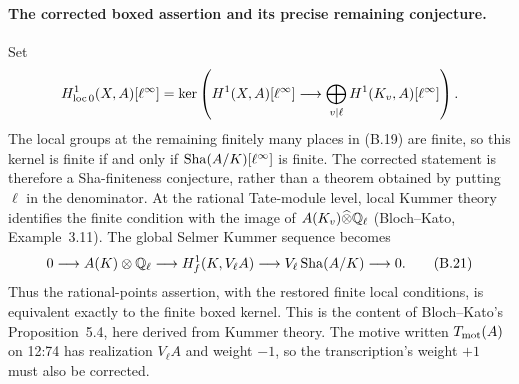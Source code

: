 \paragraph{The corrected boxed assertion and its precise remaining conjecture.}
Set
\[
 H^1_{\rm loc\,0}(X,A)[\ell^\infty]=
 \ker\left(H^1(X,A)[\ell^\infty]\longrightarrow
 \bigoplus_{v\mid\ell}H^1(K_v,A)[\ell^\infty]\right).
\]
The local groups at the remaining finitely many places in (B.19) are
finite, so this kernel is finite if and only if
\(\mathop{\mathrm{Sha}}(A/K)[\ell^\infty]\) is finite.  The corrected statement is
therefore a Sha-finiteness conjecture, rather than a theorem obtained
by putting \(\ell\) in the denominator.  At the rational Tate-module
level, local Kummer theory identifies the finite condition with
the image of \(A(K_v)\widehat\otimes\mathbb Q_\ell\) (Bloch--Kato,
Example~3.11).  The global Selmer Kummer sequence becomes
\[
0\longrightarrow A(K)\otimes\mathbb Q_\ell
\longrightarrow H_f^1(K,V_\ell A)
\longrightarrow V_\ell\mathop{\mathrm{Sha}}(A/K)\longrightarrow0.\tag{B.21}
\]
Thus the rational-points assertion, with the restored finite local
conditions, is equivalent exactly to the finite boxed kernel.
This is the content of Bloch--Kato's Proposition~5.4, here derived
from Kummer theory.  The motive written \(T_{\rm mot}(A)\) on
12:74 has realization \(V_\ell A\) and weight \(-1\), so the
transcription's weight \(+1\) must also be corrected.


